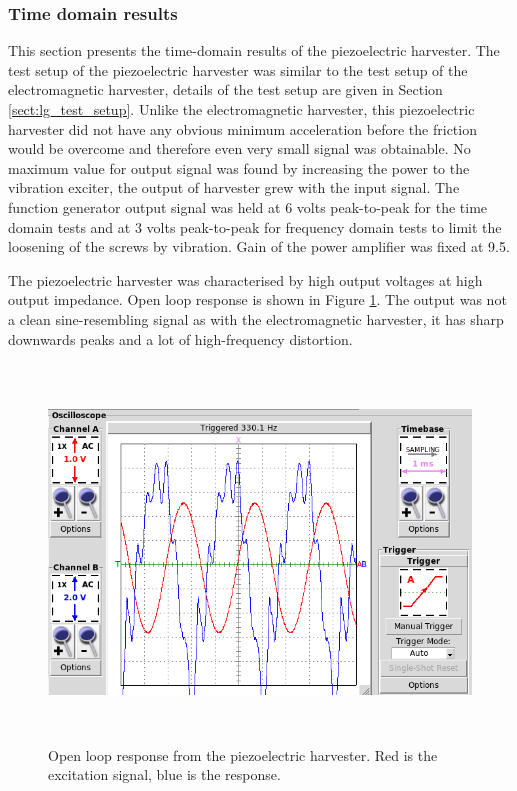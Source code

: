 \subsubsection{Time domain results}\label{sect:piezo_td}
This section presents the time-domain results of the piezoelectric harvester. The test setup of the piezoelectric harvester was similar to the test setup of the electromagnetic harvester, details of the test setup are given in Section \ref{sect:lg_test_setup}. Unlike the electromagnetic harvester, this piezoelectric harvester did not have any obvious minimum acceleration before the friction would be overcome and therefore even very small signal was obtainable. No maximum value for output signal was found by increasing the power to the vibration exciter, the output of harvester grew with the input signal. The function generator output signal was held at 6 volts peak-to-peak for the time domain tests and at 3 volts peak-to-peak for frequency domain tests to limit the loosening of the screws by vibration. Gain of the power amplifier was fixed at 9.5.

The piezoelectric harvester was characterised by high output voltages at high output impedance. Open loop response is shown in Figure \ref{fig:piezo_td_open}. The output was not a clean sine-resembling signal as with the electromagnetic harvester, it has sharp downwards peaks and a lot of high-frequency distortion.

\begin{figure}[htb]
\begin{center}
\includegraphics[height=10cm]{images/own_measurement/generator_shaker/piezo_td_open_330hz_2_2.png}
\end{center}
\caption{\label{fig:piezo_td_open} Open loop response from the piezoelectric harvester. Red is the excitation signal, blue is the response.}
\end{figure}

